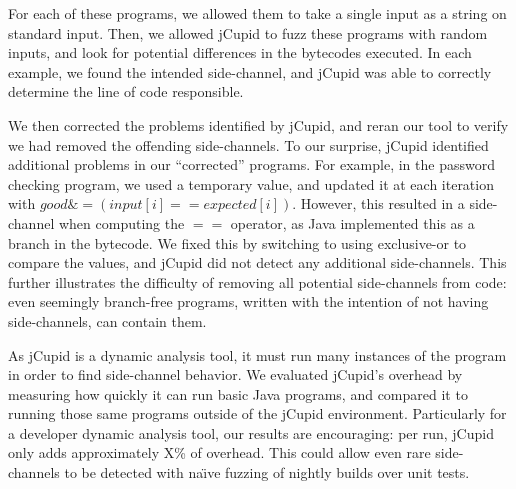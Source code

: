 For each of these programs, we allowed them to take a single input as a string
on standard input. Then, we allowed jCupid to fuzz these programs with random
inputs, and look for potential differences in the bytecodes executed. In each
example, we found the intended side-channel, and jCupid was able to correctly
determine the line of code responsible.

We then corrected the problems identified by jCupid, and reran our tool to
verify we had removed the offending side-channels. To our surprise, jCupid
identified additional problems in our ``corrected'' programs. For example, in
the password checking program, we used a temporary value, and updated it at each
iteration with $ good \&= (input[i] == expected[i]) $. However, this resulted in
a side-channel when computing the $ == $ operator, as Java implemented this as a
branch in the bytecode. We fixed this by switching to using exclusive-or to
compare the values, and jCupid did not detect any additional side-channels. This
further illustrates the difficulty of removing all potential side-channels from
code: even seemingly branch-free programs, written with the intention of not
having side-channels, can contain them.


As jCupid is a dynamic analysis tool, it must run many instances of the program
in order to find side-channel behavior. We evaluated jCupid's overhead by
measuring how quickly it can run basic Java programs, and compared it to running
those same programs outside of the jCupid environment. Particularly for a
developer dynamic analysis tool, our results are encouraging: per run, jCupid
only adds approximately X\% of overhead. This could allow even rare
side-channels to be detected with na\"{\i}ve fuzzing of nightly builds over unit
tests.
